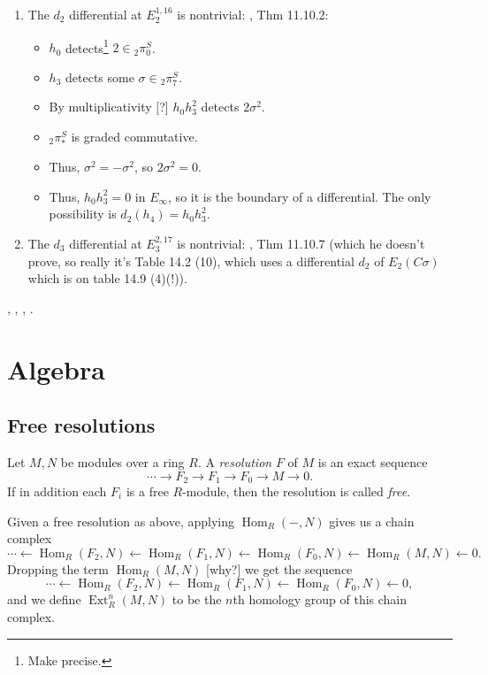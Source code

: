 \documentclass{MetricNotes2023}
\DeclareMathOperator{\Ext}{Ext}
\DeclareMathOperator{\Hom}{Hom}
\begin{document}
\begin{enumerate}
\item The \(d_2\) differential at \(E^{1, 16}_2\) is nontrivial: \autocite{rognes2}, Thm 11.10.2:
\begin{itemize}
\item \(h_0\) detects\footnote{Make precise.} \(2 \in \text{}_2\pi^S_0\).
\item \(h_3\) detects some \(\sigma \in \text{}_2\pi^S_7\).
\item By multiplicativity [?] \(h_0h_3^2\) detects \(2 \sigma^2\). 
\item \(\text{}_2\pi_*^S\) is graded commutative.
\item Thus, \(\sigma^2=-\sigma^2\), so \(2 \sigma^2=0\).
\item Thus, \(h_0h_3^2=0\) in \(E_\infty\), so it is the boundary of a differential. The only possibility is \(d_2(h_4)=h_0h_3^2\). 
\end{itemize}
\item The \(d_3\) differential at \(E^{2, 17}_3\) is nontrivial: \autocite{rognes2}, Thm 11.10.7 (which he doesn't prove, so really it's \autocite{rognes2} Table 14.2 (10), which uses a differential \(d_2\) of \(E_2(C\sigma)\) which is on table 14.9 (4)(!)). 
\end{enumerate}

\autocite{stable_homotopy}, \autocite{cobordism}, \autocite{ass}, \autocite{rognes2}.

\appendix 

\section{Algebra}

\subsection{Free resolutions}\label{2502220958}

\begin{definition}
Let \(M, N\) be modules over a ring \(R\). A \textit{resolution} \(F\) of \(M\) is an exact sequence 
\[\cdots \to F_2 \to F_1 \to F_0 \to M \to 0.\]
If in addition each \(F_i\) is a free \(R\)-module, then the resolution is called \textit{free}. 
\end{definition}

Given a free resolution as above, applying \(\Hom_R(-, N)\) gives us a chain complex
\[\cdots \leftarrow \Hom_R(F_2, N) \leftarrow \Hom_R(F_1, N) \leftarrow \Hom_R(F_0, N) \leftarrow \Hom_R(M, N) \leftarrow 0.\]
Dropping the term \(\Hom_R(M, N)\) [why?] we get the sequence
\[\cdots \leftarrow \Hom_R(F_2, N) \leftarrow \Hom_R(F_1, N) \leftarrow \Hom_R(F_0, N) \leftarrow 0,\]
and we define \(\Ext^n_R(M, N)\) to be the \(n\)th homology group of this chain complex. 
\end{document}

